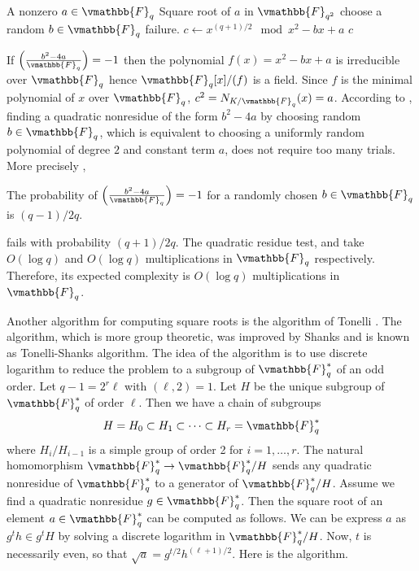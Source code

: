\begin{algorithm}
\label{algorithm:Cipolla-sq}
\begin{algorithmic}[1]
\REQUIRE A nonzero $a \in \vmathbb{F}_q$
\ENSURE Square root of $a$ in $\vmathbb{F}_{q^2}$
\STATE choose a random $b \in \vmathbb{F}_q$
	\RETURN failure.
\ENDIF
\STATE $c \leftarrow x^{(q + 1) / 2} \mod x^2 - bx + a$
\label{step:Cipolla-norm}
\RETURN $c$
\end{algorithmic}
\end{algorithm}

If $\left( \frac{b^2 - 4a}{\vmathbb{F}_q}\right) = -1$ then the polynomial $f(x) = x^2 - bx + a$ is 
irreducible over $\vmathbb{F}_q$ hence $\vmathbb{F}_q[x]/(f)$ is a field. Since $f$ is the minimal 
polynomial of $x$ over $\vmathbb{F}_q$, $c^2 = N_{K/\vmathbb{F}_q}(x) = a$. According to 
, finding a quadratic nonresidue of the form $b^2 - 4a$ by choosing 
random $b \in \vmathbb{F}_q$, which is equivalent to choosing a uniformly random polynomial of degree 
$2$ and constant term $a$, does not require too many trials. More precisely \cite[page 
158]{BachSh1996},

\begin{lemma}
The probability of $\left(\frac{b^2 - 4a}{\vmathbb{F}_q}\right) = -1$ for a randomly chosen $b \in 
\vmathbb{F}_q$ is $(q - 1)/2q$.
\end{lemma} 

 fails with probability $(q + 1) / 2q$. The quadratic residue 
test, and  take $O(\log q)$ and $O(\log q)$ multiplications in 
$\vmathbb{F}_q$ respectively. Therefore, its expected complexity is $O(\log q)$ multiplications in 
$\vmathbb{F}_q$.

Another algorithm for computing square roots is the algorithm of Tonelli \cite{Tonelli1891}. The 
algorithm, which is more group theoretic, was improved by Shanks \cite{Shanks1972} and is known as 
Tonelli-Shanks algorithm. The idea of the algorithm is to use discrete logarithm to reduce the 
problem to a subgroup of $\vmathbb{F}_q^*$ of an odd order. Let $q - 1 = 2^r\ell$ with $(\ell, 2) = 
1$. Let $H$ be the unique subgroup of $\vmathbb{F}_q^*$ of order $\ell$. Then we have a chain of 
subgroups
$$
H = H_0 \subset H_1 \subset \cdots \subset H_r = \vmathbb{F}_q^*
$$
where $H_i / H_{i - 1}$ is a simple group of order 2 for $i = 1, \dots, r$. The natural homomorphism 
$\vmathbb{F}_q^* \rightarrow \vmathbb{F}_q^* / H$ sends any quadratic nonresidue of $\vmathbb{F}_q^*$ 
to a generator of $\vmathbb{F}_q^* / H$. Assume we find a quadratic nonresidue $g \in 
\vmathbb{F}_q^*$. Then the square root of an element $a \in \vmathbb{F}_q^*$ can be computed as 
follows. We can be express $a$ as $g^th \in g^tH$ by solving a discrete logarithm in $\vmathbb{F}_q^* 
/ H$. Now, $t$ is necessarily even, so that $\sqrt{a} = g^{t / 2}h^{(\ell + 1) / 2}$. Here is the 
algorithm.

